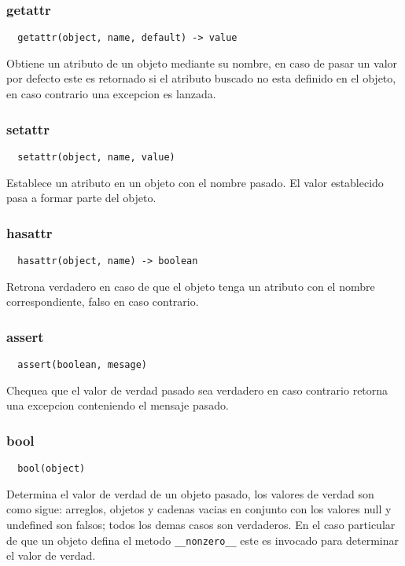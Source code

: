 \subsubsection*{getattr}
\begin{verbatim}
  getattr(object, name, default) -> value
\end{verbatim}
Obtiene un atributo de un objeto mediante su nombre, en caso de pasar un valor
por defecto este es retornado si el atributo buscado no esta definido en el
objeto, en caso contrario una excepcion es lanzada.

\subsubsection*{setattr}
\begin{verbatim}
  setattr(object, name, value)
\end{verbatim}
Establece un atributo en un objeto con el nombre pasado. El valor establecido
pasa a formar parte del objeto.

\subsubsection*{hasattr}
\begin{verbatim}
  hasattr(object, name) -> boolean
\end{verbatim}
Retrona verdadero en caso de que el objeto tenga un atributo con el nombre
correspondiente, falso en caso contrario.

\subsubsection*{assert}
\begin{verbatim}
  assert(boolean, mesage)
\end{verbatim}
Chequea que el valor de verdad pasado sea verdadero en caso contrario retorna
una excepcion conteniendo el mensaje pasado.

\subsubsection*{bool}
\begin{verbatim}
  bool(object)
\end{verbatim}
Determina el valor de verdad de un objeto pasado, los valores de verdad son como
sigue: arreglos, objetos y cadenas vacias en conjunto con los valores null y
undefined son falsos; todos los demas casos son verdaderos.
En el caso particular de que un objeto defina el metodo \verb|__nonzero__| este
es
invocado para determinar el valor de verdad.

